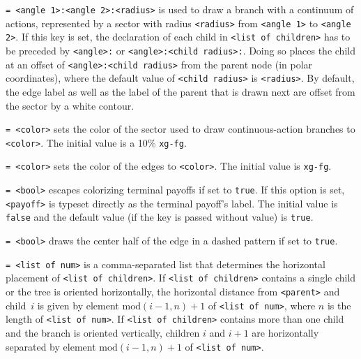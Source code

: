 \documentclass{article}
\newenvironment{desc}{\itemize[leftmargin=50pt]}{\enditemize}
\def\option#1#2{\item[\texttt{#1}] \hskip-1.5pt\texttt{#2}}
\begin{document}
\begin{desc}
\option{arc}{= <angle 1>:<angle 2>:<radius>} is used to draw a branch with a continuum of actions, represented by a sector with radius \texttt{<radius>} from \texttt{<angle 1>} to \texttt{<angle 2>}. If this key is set, the declaration of each child in \texttt{<list of children>} has to be preceded by \texttt{<angle>:} or \texttt{<angle>:<child radius>:}. Doing so places the child at an offset of \texttt{<angle>:<child radius>} from the parent node (in polar coordinates), where the default value of \texttt{<child radius>} is \texttt{<radius>}. By default, the edge label as well as the label of the parent that is drawn next are offset from the sector by a white contour. %

\option{arc color}{= <color>} sets the color of the sector used to draw continuous-action branches to \texttt{<color>}. The initial value is a 10\% \texttt{xg-fg}.

\option{color}{= <color>} sets the color of the edges to \texttt{<color>}. The initial value is \texttt{xg-fg}.


\option{e}{= <bool>} escapes colorizing terminal payoffs if set to \texttt{true}. If this option is set, \texttt{<payoff>} is typeset directly as the terminal payoff's label. The initial value is \texttt{false} and the default value (if the key is passed without value) is \texttt{true}. 

\option{etc}{= <bool>} draws the center half of the edge in a dashed pattern if set to \texttt{true}.

\option{h}{= <list of num>} is a comma-separated list that determines the horizontal placement of \texttt{<list of children>}. If \texttt{<list of children>} contains a single child or the tree is oriented horizontally, the horizontal distance from \texttt{<parent>} and child~$i$ is given by element $\mathrm{mod}(i-1, n)+1$ of \texttt{<list of num>}, where $n$ is the length of \texttt{<list of num>}. If \texttt{<list of children>} contains more than one child and the branch is oriented vertically, children $i$ and $i+1$ are horizontally separated by element $\mathrm{mod}(i-1, n)+1$ of \texttt{<list of num>}.




\end{desc}
\end{document}
